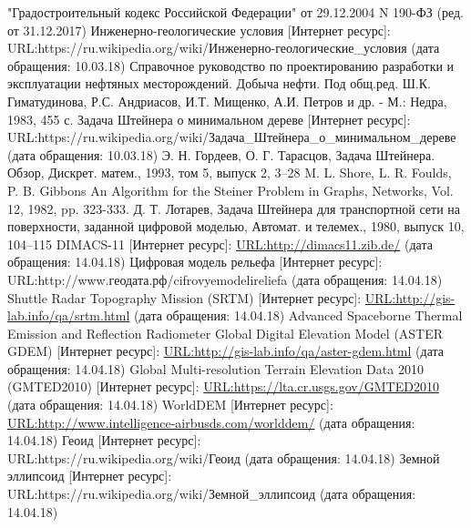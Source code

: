 \newpage
\begin{thebibliography}{8}
	"Градостроительный кодекс Российской Федерации" от 29.12.2004 N 190-ФЗ (ред. от 31.12.2017)
	 Инженерно-геологические условия [Интернет ресурс]:\\
	URL:https://ru.wikipedia.org/wiki/Инженерно-геологические\_условия (дата обращения: 10.03.18)
	Справочное руководство по проектированию разработки и эксплуатации нефтяных месторождений. Добыча нефти. Под общ.ред. Ш.К. Гиматудинова, Р.С. Андриасов, И.Т. Мищенко, А.И. Петров и др. - М.: Недра, 1983, 455 с.
	 Задача Штейнера о минимальном дереве [Интернет ресурс]:\\
	URL:https://ru.wikipedia.org/wiki/Задача\_Штейнера\_о\_минимальном\_дереве (дата обращения: 10.03.18)
	Э. Н. Гордеев, О. Г. Тарасцов, Задача Штейнера. Обзор,	Дискрет. матем., 1993, том 5, выпуск 2, 3–28
	M. L. Shore, L. R. Foulds, P. B. Gibbons An Algorithm for the Steiner Problem in Graphs, Networks, Vol. 12, 1982, pp. 323-333.
	Д. Т. Лотарев, Задача Штейнера для транспортной сети на	поверхности, заданной цифровой моделью, Автомат. и телемех., 1980, выпуск 10, 104–115
	 DIMACS-11 [Интернет ресурс]:
	\url{URL:http://dimacs11.zib.de/} (дата обращения: 14.04.18)
	 Цифровая модель рельефа [Интернет ресурс]:\\
	URL:http://www.геодата.рф/cifrovyemodelireliefa (дата обращения: 14.04.18)
	 Shuttle Radar Topography Mission (SRTM) [Интернет ресурс]:
	\url{URL:http://gis-lab.info/qa/srtm.html} (дата обращения: 14.04.18)
	 Advanced Spaceborne Thermal Emission and Reflection Radiometer Global Digital Elevation Model (ASTER GDEM) [Интернет ресурс]:
	\url{URL:http://gis-lab.info/qa/aster-gdem.html} (дата обращения: 14.04.18)
	 Global Multi-resolution Terrain Elevation Data 2010 (GMTED2010) [Интернет ресурс]:
	\url{URL:https://lta.cr.usgs.gov/GMTED2010} (дата обращения: 14.04.18)
	 WorldDEM [Интернет ресурс]:
	\url{URL:http://www.intelligence-airbusds.com/worlddem/} (дата обращения: 14.04.18)
	 Геоид [Интернет ресурс]:\\
	URL:https://ru.wikipedia.org/wiki/Геоид (дата обращения: 14.04.18)
	 Земной эллипсоид [Интернет ресурс]:\\
	URL:https://ru.wikipedia.org/wiki/Земной\_эллипсоид (дата обращения: 14.04.18)

\end{thebibliography}
